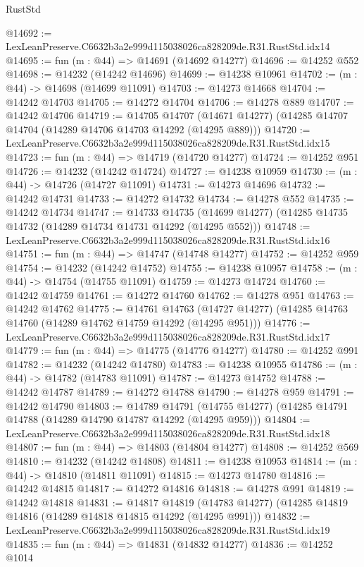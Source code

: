 \begin{lexlean}{RustStd}
\begin{coremodule}
@14692 := LexLeanPreserve.C6632b3a2e999d115038026ca828209de.R31.RustStd.idx14
@14695 := fun (m : @44) => @14691 (@14692 @14277)
@14696 := @14252 @552
@14698 := @14232 (@14242 @14696)
@14699 := @14238 @10961
@14702 := (m : @44) -> @14698 (@14699 @11091)
@14703 := @14273 @14668
@14704 := @14242 @14703
@14705 := @14272 @14704
@14706 := @14278 @889
@14707 := @14242 @14706
@14719 := @14705
    @14707
    (@14671 @14277)
    (@14285 @14707 @14704 (@14289 @14706 @14703 @14292 (@14295 @889)))
@14720 := LexLeanPreserve.C6632b3a2e999d115038026ca828209de.R31.RustStd.idx15
@14723 := fun (m : @44) => @14719 (@14720 @14277)
@14724 := @14252 @951
@14726 := @14232 (@14242 @14724)
@14727 := @14238 @10959
@14730 := (m : @44) -> @14726 (@14727 @11091)
@14731 := @14273 @14696
@14732 := @14242 @14731
@14733 := @14272 @14732
@14734 := @14278 @552
@14735 := @14242 @14734
@14747 := @14733
    @14735
    (@14699 @14277)
    (@14285 @14735 @14732 (@14289 @14734 @14731 @14292 (@14295 @552)))
@14748 := LexLeanPreserve.C6632b3a2e999d115038026ca828209de.R31.RustStd.idx16
@14751 := fun (m : @44) => @14747 (@14748 @14277)
@14752 := @14252 @959
@14754 := @14232 (@14242 @14752)
@14755 := @14238 @10957
@14758 := (m : @44) -> @14754 (@14755 @11091)
@14759 := @14273 @14724
@14760 := @14242 @14759
@14761 := @14272 @14760
@14762 := @14278 @951
@14763 := @14242 @14762
@14775 := @14761
    @14763
    (@14727 @14277)
    (@14285 @14763 @14760 (@14289 @14762 @14759 @14292 (@14295 @951)))
@14776 := LexLeanPreserve.C6632b3a2e999d115038026ca828209de.R31.RustStd.idx17
@14779 := fun (m : @44) => @14775 (@14776 @14277)
@14780 := @14252 @991
@14782 := @14232 (@14242 @14780)
@14783 := @14238 @10955
@14786 := (m : @44) -> @14782 (@14783 @11091)
@14787 := @14273 @14752
@14788 := @14242 @14787
@14789 := @14272 @14788
@14790 := @14278 @959
@14791 := @14242 @14790
@14803 := @14789
    @14791
    (@14755 @14277)
    (@14285 @14791 @14788 (@14289 @14790 @14787 @14292 (@14295 @959)))
@14804 := LexLeanPreserve.C6632b3a2e999d115038026ca828209de.R31.RustStd.idx18
@14807 := fun (m : @44) => @14803 (@14804 @14277)
@14808 := @14252 @569
@14810 := @14232 (@14242 @14808)
@14811 := @14238 @10953
@14814 := (m : @44) -> @14810 (@14811 @11091)
@14815 := @14273 @14780
@14816 := @14242 @14815
@14817 := @14272 @14816
@14818 := @14278 @991
@14819 := @14242 @14818
@14831 := @14817
    @14819
    (@14783 @14277)
    (@14285 @14819 @14816 (@14289 @14818 @14815 @14292 (@14295 @991)))
@14832 := LexLeanPreserve.C6632b3a2e999d115038026ca828209de.R31.RustStd.idx19
@14835 := fun (m : @44) => @14831 (@14832 @14277)
@14836 := @14252 @1014

\end{coremodule}
\end{lexlean}
